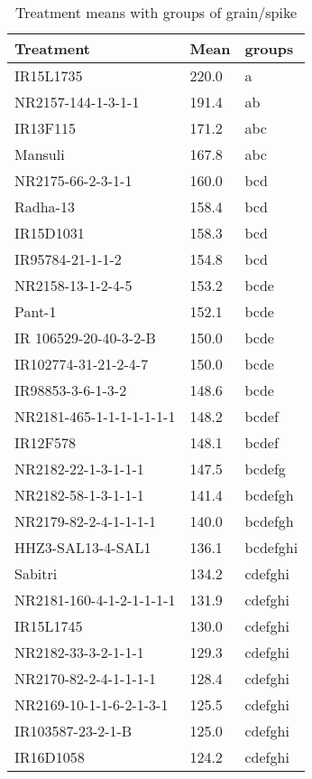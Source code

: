 \documentclass[]{article}
\begin{document}
\begin{longtable}{lll}
\caption{\label{tab:two-fac-groups-tab1}Treatment means with groups of grain/spike}\\
\toprule
Treatment & Mean & groups\\
\midrule
\rowcolor{gray!6}  IR15L1735 & 220.0 & a\\
NR2157-144-1-3-1-1 & 191.4 & ab\\
\rowcolor{gray!6}  IR13F115 & 171.2 & abc\\
Mansuli & 167.8 & abc\\
\rowcolor{gray!6}  NR2175-66-2-3-1-1 & 160.0 & bcd\\
\addlinespace
Radha-13 & 158.4 & bcd\\
\rowcolor{gray!6}  IR15D1031 & 158.3 & bcd\\
IR95784-21-1-1-2 & 154.8 & bcd\\
\rowcolor{gray!6}  NR2158-13-1-2-4-5 & 153.2 & bcde\\
Pant-1 & 152.1 & bcde\\
\addlinespace
\rowcolor{gray!6}  IR 106529-20-40-3-2-B & 150.0 & bcde\\
IR102774-31-21-2-4-7 & 150.0 & bcde\\
\rowcolor{gray!6}  IR98853-3-6-1-3-2 & 148.6 & bcde\\
NR2181-465-1-1-1-1-1-1-1 & 148.2 & bcdef\\
\rowcolor{gray!6}  IR12F578 & 148.1 & bcdef\\
\addlinespace
NR2182-22-1-3-1-1-1 & 147.5 & bcdefg\\
\rowcolor{gray!6}  NR2182-58-1-3-1-1-1 & 141.4 & bcdefgh\\
NR2179-82-2-4-1-1-1-1 & 140.0 & bcdefgh\\
\rowcolor{gray!6}  HHZ3-SAL13-4-SAL1 & 136.1 & bcdefghi\\
Sabitri & 134.2 & cdefghi\\
\addlinespace
\rowcolor{gray!6}  NR2181-160-4-1-2-1-1-1-1 & 131.9 & cdefghi\\
IR15L1745 & 130.0 & cdefghi\\
\rowcolor{gray!6}  NR2182-33-3-2-1-1-1 & 129.3 & cdefghi\\
NR2170-82-2-4-1-1-1-1 & 128.4 & cdefghi\\
\rowcolor{gray!6}  NR2169-10-1-1-6-2-1-3-1 & 125.5 & cdefghi\\
\addlinespace
IR103587-23-2-1-B & 125.0 & cdefghi\\
\rowcolor{gray!6}  IR16D1058 & 124.2 & cdefghi\\

\end{longtable}
\end{document}
